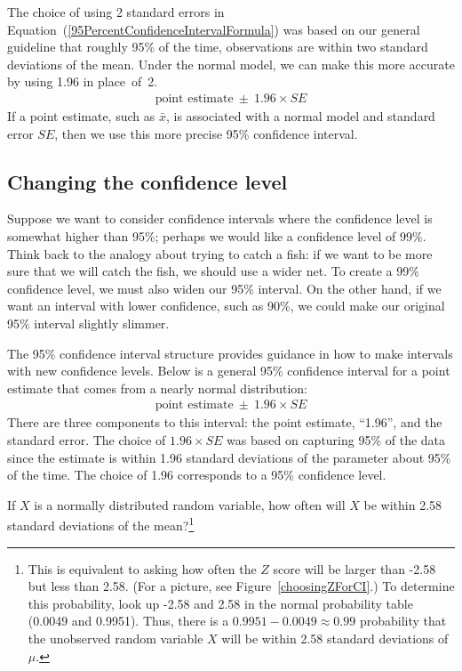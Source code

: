 The choice of using 2 standard errors in Equation~(\ref{95PercentConfidenceIntervalFormula}) was based on our general guideline that roughly 95\% of the time, observations are within two standard deviations of the mean. Under the normal model, we can make this more accurate by using 1.96 in place~of~2.
\begin{eqnarray}
\text{point estimate}\ \pm\ 1.96\times SE
\label{95PercentCIWhenUsingNormalModel}
\end{eqnarray}
If a point estimate, such as $\bar{x}$, is associated with a normal model and standard error $SE$, then we use this more precise 95\% confidence interval.


\subsection{Changing the confidence level}
\label{changingTheConfidenceLevelSection}


Suppose we want to consider confidence intervals where the confidence level is somewhat higher than 95\%; perhaps we would like a confidence level of 99\%. Think back to the analogy about trying to catch a fish: if we want to be more sure that we will catch the fish, we should use a wider net. To create a 99\% confidence level, we must also widen our 95\% interval. On the other hand, if we want an interval with lower confidence, such as 90\%, we could make our original 95\% interval slightly slimmer.

The 95\% confidence interval structure provides guidance in how to make intervals with new confidence levels. Below is a general 95\% confidence interval for a point estimate that comes from a nearly normal distribution:
\begin{eqnarray}
\text{point estimate}\ \pm\ 1.96\times SE
\end{eqnarray}
There are three components to this interval: the point estimate, ``1.96'', and the standard error. The choice of $1.96\times SE$ was based on capturing 95\% of the data since the estimate is within 1.96 standard deviations of the parameter about 95\% of the time. The choice of 1.96 corresponds to a 95\% confidence level. 

\begin{exercise} \label{leadInForMakingA99PercentCIExercise}
If $X$ is a normally distributed random variable, how often will $X$ be within 2.58 standard deviations of the mean?\footnote{This is equivalent to asking how often the $Z$ score will be larger than -2.58 but less than 2.58. (For a picture, see Figure~\ref{choosingZForCI}.) To determine this probability, look up -2.58 and 2.58 in the normal probability table (0.0049 and 0.9951). Thus, there is a $0.9951-0.0049 \approx 0.99$ probability that the unobserved random variable $X$ will be within 2.58 standard deviations of $\mu$.}
\end{exercise}

